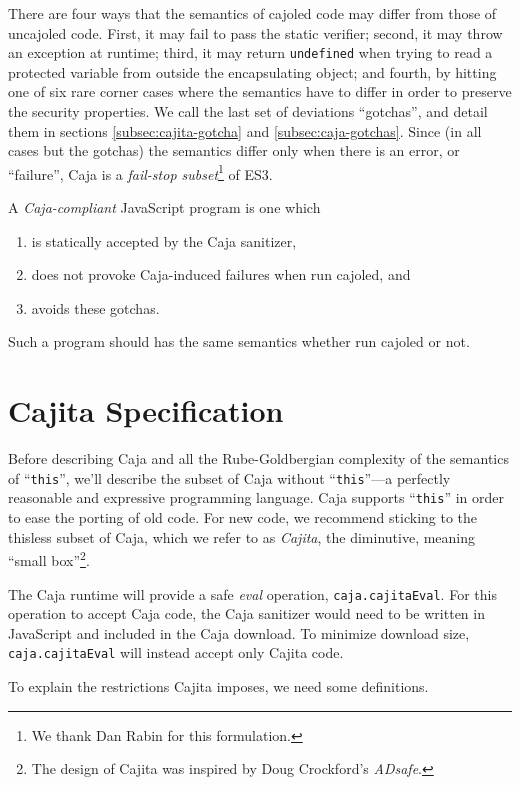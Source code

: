 \documentclass[letterpaper,twocolumn,10pt]{article}
\newcommand{\code}[1]{{\tt {#1}}}              %
\begin{document}
There are four ways that the semantics of cajoled code may differ from those of uncajoled code.
First, it may fail to pass the static verifier; second, it may throw an exception at runtime; third, it
may return \code{undefined} when trying to read a protected variable from outside the encapsulating
object; and fourth, by hitting one of six rare corner cases where the semantics have to differ in order
to preserve the security properties.  We call the last set of deviations ``gotchas'', and detail them
in sections \ref{subsec:cajita-gotcha} and \ref{subsec:caja-gotchas}.  Since (in all cases but the gotchas) 
the semantics differ only when there is an error, or ``failure'', Caja is a \emph{fail-stop subset}\footnote{
%
We thank Dan Rabin for this formulation.
%
} of ES3.

A \emph{Caja-compliant} JavaScript program is one which
\begin{enumerate}
  \item is statically accepted by the Caja sanitizer,
  \item does not provoke Caja-induced failures when run cajoled, and
  \item avoids these gotchas.
\end{enumerate}
Such a program should has the same semantics whether run cajoled or not.


\section{Cajita Specification}
\label{sec:cajita-spec}
Before describing Caja and all the Rube-Goldbergian complexity of the
semantics of ``\code{this}'', we'll describe the subset of Caja without 
``\code{this}''---a perfectly reasonable and expressive programming 
language. Caja supports ``\code{this}'' in order to ease the porting of old 
code. For new code, we recommend sticking to the thisless subset of Caja, 
which we refer to as \emph{Cajita}, the diminutive, meaning ``small 
box''\footnote{
%
The design of Cajita was inspired by Doug Crockford's \emph{ADsafe}.
%
}.

The Caja runtime will provide a safe \emph{eval} operation, \code{caja.cajitaEval}. For 
this operation to accept Caja code, the Caja sanitizer would need to be 
written in JavaScript and included in the Caja download. To minimize download 
size, \code{caja.cajitaEval} will instead accept only Cajita code.

To explain the restrictions Cajita imposes, we need some definitions.
\end{document}

